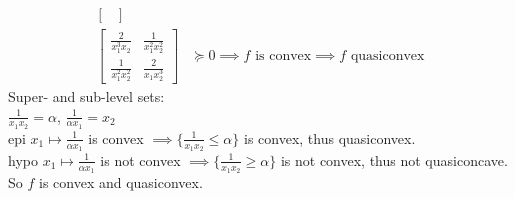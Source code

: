 \documentclass[12pt,letter]{article}
\newcommand{\R}{\mathbb{R}}
\newcommand{\set}[1]{\{#1\}}
\begin{document}
\begin{enumerate}
\begin{enumerate}
\begin{align*}
\begin{bmatrix}
      \end{bmatrix}\\
      \begin{bmatrix}
        \frac{2}{x_1^3 x_2} & \frac{1}{x_1^2 x_2^2}\\
        \frac{1}{x_1^2 x_2^2} & \frac{2}{x_1 x_2^3}
      \end{bmatrix} & \succeq 0 \implies f \text{ is convex} \implies f \text{ quasiconvex}
    \end{align*}
    Super- and sub-level sets:\\
    $\frac{1}{x_1x_2} = \alpha$, $\frac{1}{\alpha x_1} = x_2$\\
    epi $x_1 \mapsto \frac{1}{\alpha x_1}$ is convex $\implies \set{\frac{1}{x_1x_2} \leq \alpha}$ is convex, thus quasiconvex.\\
    hypo $x_1 \mapsto \frac{1}{\alpha x_1}$ is not convex $\implies \set{\frac{1}{x_1x_2} \geq \alpha}$ is not convex, thus not quasiconcave.\\
    So $f$ is convex and quasiconvex.

\end{enumerate}
\end{enumerate}
\end{document}
